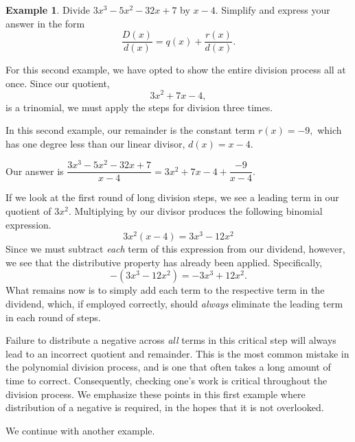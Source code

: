 \documentclass[12pt]{book}
\theoremstyle{definition}
\newtheorem{example}{Example}
\begin{document}
\begin{example} Divide $3x^3-5x^2-32x+7$ by $x-4$.  Simplify and express your answer in the form
$$\frac{D(x)}{d(x)}=q(x)+\dfrac{r(x)}{d(x)}.$$

\begin{multicols}{2}

\columnbreak

For this second example, we have opted to show the entire division process all at once.  Since our quotient,
$$3x^2+7x-4,$$
is a trinomial, we must apply the steps for division three times.
\par
In this second example, our remainder is the constant term $r(x)=-9,$ which has one degree less than our linear divisor, $d(x)=x-4$.
\end{multicols}
Our answer is $\dfrac{3x^3-5x^2-32x+7}{x-4}=3x^2+7x-4+\dfrac{-9}{x-4}.$
\par
If we look at the first round of long division steps, we see a leading term in our quotient of $3x^2$.  Multiplying by our divisor produces the following binomial expression.
$$3x^2(x-4)=3x^3-12x^2$$
Since we must subtract {\it each} term of this expression from our dividend, however, we see that the distributive property has already been applied.  Specifically,
$$-(3x^3-12x^2)=-3x^3+12x^2.$$
What remains now is to simply add each term to the respective term in the dividend, which, if employed correctly, should {\it always} eliminate the leading term in each round of steps.
\par
Failure to distribute a negative across {\it all} terms in this critical step will always lead to an incorrect quotient and remainder.  This is the most common mistake in the polynomial division process, and is one that often takes a long amount of time to correct.  Consequently, checking one's work is critical throughout the division process.  We emphasize these points in this first example where distribution of a negative is required, in the hopes that it is not overlooked.
\end{example}
We continue with another example.
\end{document}
